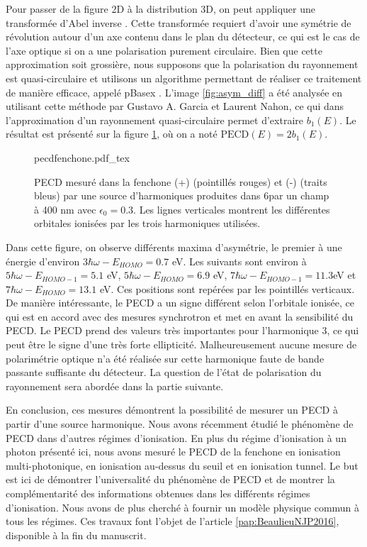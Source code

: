 Pour passer de la figure 2D à la distribution 3D, on peut appliquer une transformée d'Abel inverse . Cette transformée requiert d'avoir une symétrie de révolution autour d'un axe contenu dans le plan du détecteur, ce qui est le cas de l'axe optique si on a une polarisation purement circulaire. Bien que cette approximation soit grossière, nous supposons que la polarisation du rayonnement est quasi-circulaire et utilisons un algorithme permettant de réaliser ce traitement de manière efficace, appelé pBasex . L'image \ref{fig:asym_diff} a été analysée en utilisant cette méthode par Gustavo A. Garcia et Laurent Nahon, ce qui dans l'approximation d'un rayonnement quasi-circulaire permet d'extraire $b_1(E)$. Le résultat est présenté sur la figure \ref{fig:pecdfenchone}, où on a noté $\text{PECD}(E) = 2b_1(E)$.

\begin{figure}[!ht]
\centering
\def\svgwidth{1\columnwidth}
{pecdfenchone.pdf_tex}
\caption{PECD mesuré dans la fenchone (+) (pointillés rouges) et (-) (traits bleus) par une source d'harmoniques produites dans \sf6par un champ à 400 nm avec $\epsilon_0=0.3$. Les lignes verticales montrent les différentes orbitales ionisées par les trois harmoniques utilisées.}
\label{fig:pecdfenchone}
\end{figure}

Dans cette figure, on observe différents maxima d'asymétrie, le premier à une énergie d'environ $3\hbar\omega - E_{HOMO}= 0.7$ eV. Les suivants sont environ à $5\hbar\omega - E_{HOMO-1}= 5.1$ eV, $5\hbar\omega - E_{HOMO}= 6.9$ eV, $7\hbar\omega - E_{HOMO-1}= 11.3$eV et $7\hbar\omega - E_{HOMO}= 13.1$ eV. Ces positions sont repérées par les pointillés verticaux. De manière intéressante, le PECD a un signe différent selon l'orbitale ionisée, ce qui est en accord avec des mesures synchrotron  et met en avant la sensibilité du PECD. Le PECD prend des valeurs très importantes pour l'harmonique 3, ce qui peut être le signe d'une très forte ellipticité. Malheureusement aucune mesure de polarimétrie optique n'a été réalisée sur cette harmonique faute de bande passante suffisante du détecteur. La question de l'état de polarisation du rayonnement sera abordée dans la partie suivante.

En conclusion, ces mesures démontrent la possibilité de mesurer un PECD à partir d'une source harmonique. Nous avons récemment étudié le phénomène de PECD dans d'autres régimes d'ionisation. En plus du régime d'ionisation à un photon présenté ici, nous avons mesuré le PECD de la fenchone en ionisation multi-photonique, en ionisation au-dessus du seuil et en ionisation tunnel. Le but est ici de démontrer l'universalité du phénomène de PECD et de montrer la complémentarité des informations obtenues dans les différents régimes d'ionisation. Nous avons de plus cherché à fournir un modèle physique commun à tous les régimes. Ces travaux font l'objet de l'article \ref{pap:BeaulieuNJP2016}, disponible à la fin du manuscrit.

